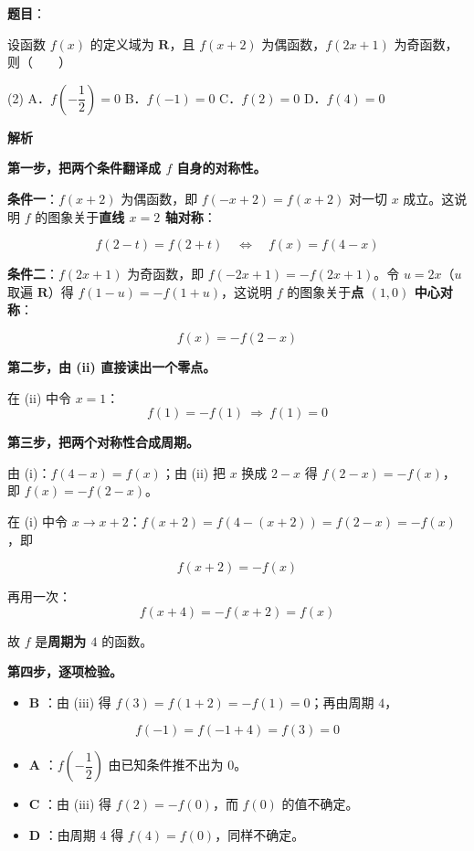 \begin{answer}

\textbf{题目}：

设函数 $f(x)$ 的定义域为 $\mathbf R$，且 $f(x+2)$ 为偶函数，$f(2x+1)$ 为奇函数，则\mbox{（　　）}

\begin{gkopts}(2)
\task A．$f\left(-\dfrac12\right)=0$
\task B．$f(-1)=0$
\task C．$f(2)=0$
\task D．$f(4)=0$
\end{gkopts}

\textbf{解析}

\textbf{第一步，把两个条件翻译成 $f$ 自身的对称性。}

\textbf{条件一}：$f(x+2)$ 为偶函数，即 $f(-x+2)=f(x+2)$ 对一切 $x$ 成立。这说明 $f$ 的图象关于\textbf{直线 $x=2$ 轴对称}：

\nopagebreak[4]
\[f(2-t)=f(2+t)\quad\Longleftrightarrow\quad f(x)=f(4-x)\tag{i}\]

\textbf{条件二}：$f(2x+1)$ 为奇函数，即 $f(-2x+1)=-f(2x+1)$。令 $u=2x$（$u$ 取遍 $\mathbf R$）得 $f(1-u)=-f(1+u)$，这说明 $f$ 的图象关于\textbf{点 $(1,0)$ 中心对称}：

\nopagebreak[4]
\[f(x)=-f(2-x)\tag{ii}\]

\textbf{第二步，由 (ii) 直接读出一个零点。}

在 (ii) 中令 $x=1$：
\nopagebreak[4]
\[f(1)=-f(1)\ \Longrightarrow\ f(1)=0\]

\textbf{第三步，把两个对称性合成周期。}

由 (i)：$f(4-x)=f(x)$；由 (ii) 把 $x$ 换成 $2-x$ 得 $f(2-x)=-f(x)$，即 $f(x)=-f(2-x)$。

在 (i) 中令 $x\to x+2$：$f(x+2)=f(4-(x+2))=f(2-x)=-f(x)$，即

\nopagebreak[4]
\[f(x+2)=-f(x)\tag{iii}\]

再用一次：
\nopagebreak[4]
\[f(x+4)=-f(x+2)=f(x)\]

故 $f$ 是\textbf{周期为 $4$} 的函数。

\textbf{第四步，逐项检验。}

\begin{itemize}
\item \textbf{B }：由 (iii) 得 $f(3)=f(1+2)=-f(1)=0$；再由周期 $4$，
\end{itemize}
\nopagebreak[4]
\[f(-1)=f(-1+4)=f(3)=0\]
\begin{itemize}
\item \textbf{A }：$f\left(-\dfrac12\right)$ 由已知条件推不出为 $0$。
\item \textbf{C }：由 (iii) 得 $f(2)=-f(0)$，而 $f(0)$ 的值不确定。
\item \textbf{D }：由周期 $4$ 得 $f(4)=f(0)$，同样不确定。
\end{itemize}


\end{answer}
